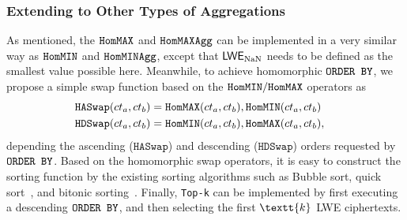 \subsubsection{Extending to Other Types of Aggregations}
As mentioned, the ${\texttt{HomMAX}}$ and ${\texttt{HomMAXAgg}}$ 
can be implemented in a very similar way as ${\texttt{HomMIN}}$ and ${\texttt{HomMINAgg}}$,
except that ${\mathsf{LWE_{\rm NaN}}}$ needs to be defined as the smallest value
possible here.
Meanwhile, to achieve homomorphic $\texttt{ORDER BY}$, we propose a simple
swap function based on the ${\texttt{HomMIN}}/{\texttt{HomMAX}}$ operators as
\begin{align}
    &\texttt{HASwap}(ct_a,ct_b) =  {\texttt{HomMAX}}(ct_a, ct_b),
    {\texttt{HomMIN}}(ct_a, ct_b)&
    \\
    &\texttt{HDSwap}(ct_a,ct_b) = {\texttt{HomMIN}}(ct_a, ct_b),
    {\texttt{HomMAX}}(ct_a, ct_b),&
\end{align}
depending the ascending ($\texttt{HASwap}$) and descending
($\texttt{HDSwap}$) orders requested by $\texttt{ORDER BY}$. 
Based on the homomorphic swap operators,
it is easy to construct the sorting function by the existing sorting 
algorithms such as Bubble sort, quick sort~\cite{quicksort}, and 
bitonic sorting~\cite{bisort}.
Finally, \texttt{Top-k} can be implemented by first executing a
descending $\texttt{ORDER BY}$, and then selecting the first $\textt{k}$ LWE 
ciphertexts.